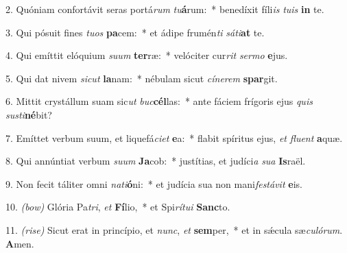2. Quóniam confortávit seras portá\textit{rum} \textit{tu}\textbf{á}rum:~* benedíxit fíli\textit{is} \textit{tu}\textit{is} \textbf{in} te.

3. Qui pósuit fines \textit{tu}\textit{os} \textbf{pa}cem:~* et ádipe frumén\textit{ti} \textit{sá}\textit{ti}\textbf{at} te.

4. Qui emíttit elóquium \textit{su}\textit{um} \textbf{ter}ræ:~* velóciter cur\textit{rit} \textit{ser}\textit{mo} \textbf{e}jus.

5. Qui dat nivem \textit{sic}\textit{ut} \textbf{la}nam:~* nébulam sicut \textit{cí}\textit{ne}\textit{rem} \textbf{spar}git.

6. Mittit crystállum suam sic\textit{ut} \textit{buc}\textbf{cél}las:~* ante fáciem frígoris ejus \textit{quis} \textit{sus}\textit{ti}\textbf{né}bit?

7. Emíttet verbum suum, et liquefá\textit{ci}\textit{et} \textbf{e}a:~* flabit spíritus ejus, \textit{et} \textit{flu}\textit{ent} \textbf{a}quæ.

8. Qui annúntiat verbum \textit{su}\textit{um} \textbf{Ja}cob:~* justítias, et judíci\textit{a} \textit{su}\textit{a} \textbf{Is}raël.

9. Non fecit táliter omni \textit{na}\textit{ti}\textbf{ó}ni:~* et judícia sua non mani\textit{fes}\textit{tá}\textit{vit} \textbf{e}is.

10. {\color{red}\textit{(bow)}} Glória Pa\textit{tri}, \textit{et} \textbf{Fí}lio,~* et Spi\textit{rí}\textit{tu}\textit{i} \textbf{Sanc}to.

11. {\color{red}\textit{(rise)}} Sicut erat in princípio, et \textit{nunc}, \textit{et} \textbf{sem}per,~* et in s\'{\ae}cula sæ\textit{cu}\textit{ló}\textit{rum}. \textbf{A}men.